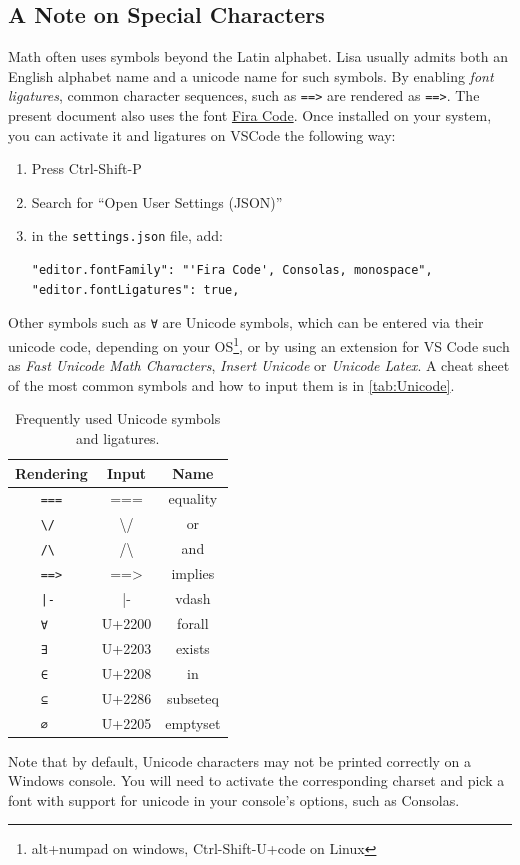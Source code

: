 \subsection*{A Note on Special Characters}
Math often uses symbols beyond the Latin alphabet. Lisa usually admits both an English alphabet name and a unicode name for such symbols. By enabling \emph{font ligatures}, common character sequences, such as \lstinline|=|\lstinline|=|\lstinline|>| are rendered as \lstinline|==>|.
The present document also uses the font \href{https://github.com/tonsky/FiraCode}{Fira Code}. Once installed on your system, you can activate it and ligatures on VSCode the following way:
\begin{enumerate}
  \item Press Ctrl-Shift-P
  \item Search for ``Open User Settings (JSON)''
  \item in the \lstinline|settings.json| file, add:
  \begin{lstlisting}
"editor.fontFamily": "'Fira Code', Consolas, monospace",
"editor.fontLigatures": true,
  \end{lstlisting}
\end{enumerate}
Other symbols such as \lstinline|∀| are Unicode symbols, which can be entered via their unicode code, depending on your OS\footnote{alt+numpad on windows, Ctrl-Shift-U+code on Linux}, or by using an extension for VS Code such as \emph{Fast Unicode Math Characters}, \emph{Insert Unicode} or \emph{Unicode Latex}.
A cheat sheet of the most common symbols and how to input them is in \autoref{tab:Unicode}.
\begin{table}
  \center
  \begin{tabular}{c|c|c}
    Rendering         & Input            & Name     \\ \hline
    \lstinline| === | & ===              & equality \\ \hline
    \lstinline| \/  | & \textbackslash / & or       \\ \hline
    \lstinline| /\  | & /\textbackslash  & and      \\ \hline
    \lstinline| ==> | & ==>              & implies  \\ \hline
    \lstinline+ |-  + &  |-              & vdash    \\ \hline
    \lstinline| ∀   | & U+2200           & forall   \\ \hline
    \lstinline| ∃   | & U+2203           & exists   \\ \hline
    \lstinline| ∈   | & U+2208           & in       \\ \hline
    \lstinline| ⊆   | & U+2286           & subseteq \\ \hline
    \lstinline| ∅   | & U+2205           & emptyset \\
  \end{tabular}
  \caption{Frequently used Unicode symbols and ligatures.}
  \label{tab:Unicode}
\end{table}
Note that by default, Unicode characters may not be printed correctly on a Windows console. You will need to activate the corresponding charset and pick a font with support for unicode in your console's options, such as Consolas.


